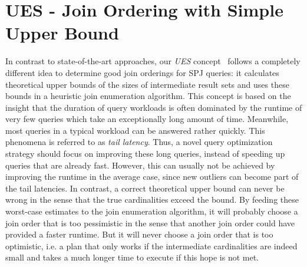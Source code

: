 \section{UES - Join Ordering with Simple Upper Bound}
\label{sec:UES}

In contrast to state-of-the-art approaches, our \emph{UES} concept~\cite{hertzschuch-21-ues} follows a completely different idea to determine good join orderings for SPJ queries: it calculates theoretical upper bounds of the sizes of intermediate result sets and uses these bounds in a heuristic join enumeration algorithm. 
This concept is based on the insight that the duration of query workloads is often dominated by the runtime of very few queries which take an exceptionally long amount of time. 
Meanwhile, most queries in a typical workload can be answered rather quickly. 
This phenomena is referred to as \emph{tail latency}.
Thus, a novel query optimization strategy should focus on improving these long queries, instead of speeding up queries that are already fast. 
However, this can usually not be achieved by improving the runtime in the average case, since new outliers can become part of the tail latencies. 
In contrast, a correct theoretical upper bound can never be wrong in the sense that the true cardinalities exceed the bound. 
By feeding these worst-case estimates to the join enumeration algorithm, it will probably choose a join order that is too pessimistic in the sense that another join order could have provided a faster runtime. 
But it will never choose a join order that is too optimistic, i.e. a plan that only works if the intermediate cardinalities are indeed small and takes a much longer time to execute if this hope is not met.


